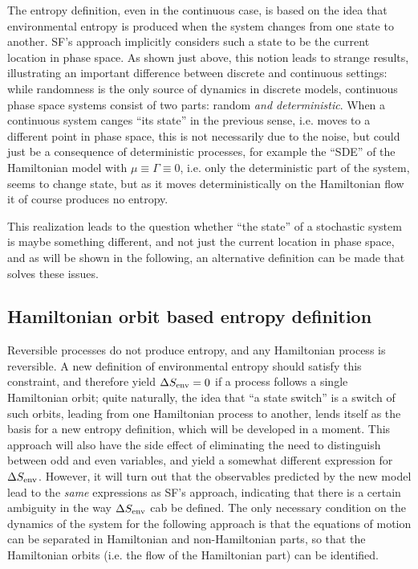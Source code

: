 The entropy definition, even in the continuous case, is based on the idea that environmental entropy is produced when the system changes from one state to another. SF's approach implicitly considers such a state to be the current location in phase space. As shown just above, this notion leads to strange results, illustrating an important difference between discrete and continuous settings: while randomness is the only source of dynamics in discrete models, continuous phase space systems consist of two parts: random \emph{and deterministic}.
When a continuous system canges ``its state'' in the previous sense, i.e. moves to a different point in phase space, this is not necessarily due to the noise, but could just be a consequence of deterministic processes, for example the ``SDE'' of the Hamiltonian model  with \(\mu \equiv \Gamma \equiv 0\), i.e. only the deterministic part of the system, seems to change state, but as it moves deterministically on the Hamiltonian flow it of course produces no entropy.

This realization leads to the question whether ``the state'' of a stochastic system is maybe something different, and not just the current location in phase space, and as will be shown in the following, an alternative definition can be made that solves these issues.

\subsection{Hamiltonian orbit based entropy definition}
\label{sec:flow entropy}

Reversible processes do not produce entropy, and any Hamiltonian process is reversible. A new definition of environmental entropy should satisfy this constraint, and therefore yield \(\Delta S_\text{env} = 0\) if a process follows a single Hamiltonian orbit; quite naturally, the idea that ``a state switch'' is a switch of such orbits, leading from one Hamiltonian process to another, lends itself as the basis for a new entropy definition, which will be developed in a moment. This approach will also have the side effect of eliminating the need to distinguish between odd and even variables, and yield a somewhat different expression for \(\Delta S_\text{env}\). However, it will turn out that the observables predicted by the new model lead to the \emph{same} expressions as SF's approach, indicating that there is a certain ambiguity in the way \(\Delta S_\text{env}\) cab be defined. The only necessary condition on the dynamics of the system for the following approach is that the equations of motion can be separated in Hamiltonian and non-Hamiltonian parts, so that the Hamiltonian orbits (i.e. the flow of the Hamiltonian part) can be identified.


